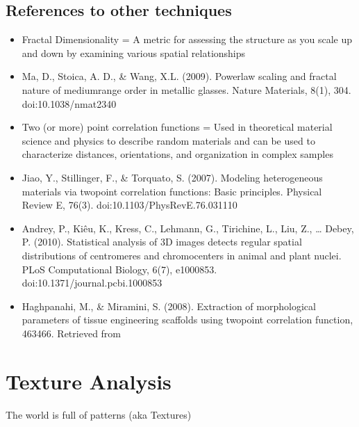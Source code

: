 \documentclass[letterpaper,10pt,english]{sphinxmanual}
\begin{document}
\section{References to other techniques}
\label{\detokenize{06-AdvancedShapeAndTexture:references-to-other-techniques}}\begin{itemize}
\item {} 
\sphinxAtStartPar
Fractal Dimensionality = A metric for assessing the structure as you scale up and down by examining various spatial relationships

\item {} 
\sphinxAtStartPar
Ma, D., Stoica, A. D., \& Wang, X.\sphinxhyphen{}L. (2009). Power\sphinxhyphen{}law scaling and fractal nature of medium\sphinxhyphen{}range order in metallic glasses. Nature Materials, 8(1), 30\textendash{}4. doi:10.1038/nmat2340

\item {} 
\sphinxAtStartPar
Two (or more) point correlation functions = Used in theoretical material science and physics to describe random materials and can be used to characterize distances, orientations, and organization in complex samples

\item {} 
\sphinxAtStartPar
Jiao, Y., Stillinger, F., \& Torquato, S. (2007). Modeling heterogeneous materials via two\sphinxhyphen{}point correlation functions: Basic principles. Physical Review E, 76(3). doi:10.1103/PhysRevE.76.031110

\item {} 
\sphinxAtStartPar
Andrey, P., Kiêu, K., Kress, C., Lehmann, G., Tirichine, L., Liu, Z., … Debey, P. (2010). Statistical analysis of 3D images detects regular spatial distributions of centromeres and chromocenters in animal and plant nuclei. PLoS Computational Biology, 6(7), e1000853. doi:10.1371/journal.pcbi.1000853

\item {} 
\sphinxAtStartPar
Haghpanahi, M., \& Miramini, S. (2008). Extraction of morphological parameters of tissue engineering scaffolds using two\sphinxhyphen{}point correlation function, 463\textendash{}466. Retrieved from 

\end{itemize}


\chapter{Texture Analysis}
\label{\detokenize{06-AdvancedShapeAndTexture:texture-analysis}}
\sphinxAtStartPar
The world is full of patterns (aka Textures)
\end{document}
